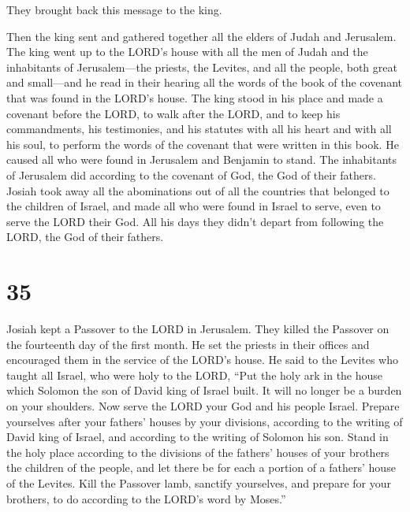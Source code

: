 They brought back this message to the king.

 Then the king sent and gathered together all the elders
of Judah and Jerusalem.  The king went up to the LORD's
house with all the men of Judah and the inhabitants of Jerusalem---the
priests, the Levites, and all the people, both great and small---and he
read in their hearing all the words of the book of the covenant that was
found in the LORD's house.  The king stood in his place
and made a covenant before the LORD, to walk after the LORD, and to keep
his commandments, his testimonies, and his statutes with all his heart
and with all his soul, to perform the words of the covenant that were
written in this book.  He caused all who were found in
Jerusalem and Benjamin to stand. The inhabitants of Jerusalem did
according to the covenant of God, the God of their fathers.
 Josiah took away all the abominations out of all the
countries that belonged to the children of Israel, and made all who were
found in Israel to serve, even to serve the LORD their God. All his days
they didn't depart from following the LORD, the God of their fathers.

\hypertarget{section-34}{%
\section{35}\label{section-34}}

 Josiah kept a Passover to the LORD in Jerusalem. They
killed the Passover on the fourteenth day of the first month.
 He set the priests in their offices and encouraged them
in the service of the LORD's house.  He said to the
Levites who taught all Israel, who were holy to the LORD, ``Put the holy
ark in the house which Solomon the son of David king of Israel built. It
will no longer be a burden on your shoulders. Now serve the LORD your
God and his people Israel.  Prepare yourselves after your
fathers' houses by your divisions, according to the writing of David
king of Israel, and according to the writing of Solomon his son.
 Stand in the holy place according to the divisions of the
fathers' houses of your brothers the children of the people, and let
there be for each a portion of a fathers' house of the Levites.
 Kill the Passover lamb, sanctify yourselves, and prepare
for your brothers, to do according to the LORD's word by Moses.''

